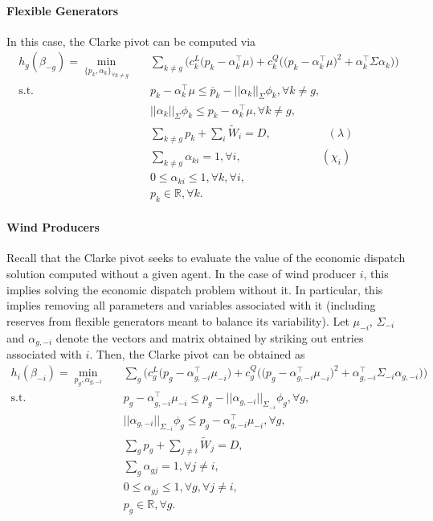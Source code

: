 \documentclass{article}
\begin{document}
\paragraph{Flexible Generators} In this case, the Clarke pivot can be computed via
\begin{align*}
h_g(\beta_{-g}) = \underset{\{p_k, \alpha_k\}_{\forall k \ne g}}{\min} \hspace{10pt} & \sum_{k \ne g} \Big(c_k^L\big(p_k - \alpha_k^\top \mu\big) + c_k^Q \Big(\big(p_k - \alpha_k^\top \mu \big)^2 + \alpha_k^\top \Sigma \alpha_k\Big)\Big)\\
\mbox{s.t. } & p_k - \alpha_k^\top \mu\le \overline{p}_k - ||\alpha_k||_{\Sigma} \phi_k,\forall k \ne g,\\
& ||\alpha_k||_{\Sigma} \phi_k \le p_k - \alpha_k^\top \mu,\forall k \ne g,\\
& \sum_{k \ne g} p_k + \sum_i \tilde{W}_i = D, \hspace{60pt} (\lambda)\\
& \sum_{k \ne g} \alpha_{ki} = 1, \forall i, \hspace{85pt} (\chi_i)\\
& 0 \le \alpha_{ki} \le 1, \forall k, \forall i,\\
& p_k \in \mathbb{R}, \forall k.
\end{align*}

\paragraph{Wind Producers} Recall that the Clarke pivot seeks to evaluate the value of the economic dispatch solution computed without a given agent. In the case of wind producer $i$, this implies solving the economic dispatch problem without it. In particular, this implies removing all parameters and variables associated with it (including reserves from flexible generators meant to balance its variability). Let $\mu_{-i}$, $\Sigma_{-i}$ and $\alpha_{g, -i}$ denote the vectors and matrix obtained by striking out entries associated with $i$. Then, the Clarke pivot can be obtained as
\begin{align*}
h_i(\beta_{-i}) = \underset{p_g, \alpha_{g,-i}}{\min} \hspace{10pt} & \sum_g \Big(c_g^L\big(p_g - \alpha_{g,-i}^\top \mu_{-i}\big) + c_g^Q \Big(\big(p_g - \alpha_{g,-i}^\top \mu_{-i} \big)^2 + \alpha_{g,-i}^\top \Sigma_{-i} \alpha_{g,-i}\Big)\Big)\\
\mbox{s.t. } & p_g - \alpha_{g,-i}^\top \mu_{-i} \le \overline{p}_g - ||\alpha_{g,-i}||_{\Sigma_{-i}} \phi_g,\forall g,\\
& ||\alpha_{g,-i}||_{\Sigma_{-i}} \phi_g \le p_g - \alpha_{g,-i}^\top \mu_{-i},\forall g,\\
& \sum_g p_g + \sum_{j \ne i} \tilde{W}_j = D,\\
& \sum_g \alpha_{gj} = 1, \forall j \ne i,\\
& 0 \le \alpha_{gj} \le 1, \forall g, \forall j \ne i,\\
& p_g \in \mathbb{R}, \forall g.
\end{align*}
\end{document}
